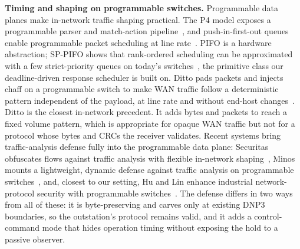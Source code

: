 \noindent\textbf{Timing and shaping on programmable switches.} Programmable data planes make in-network
traffic shaping practical. The P4 model exposes a programmable parser and match-action
pipeline~\cite{p4ccr2014}, and push-in-first-out queues enable programmable packet scheduling at line
rate~\cite{pifo2016}. PIFO is a hardware abstraction; SP-PIFO shows that rank-ordered scheduling can be
approximated with a few strict-priority queues on today's switches~\cite{sppifo2020}, the primitive
class our deadline-driven response scheduler is built on. Ditto pads packets and injects chaff on a
programmable switch to make WAN traffic
follow a deterministic pattern independent of the payload, at line rate and without end-host
changes~\cite{ditto2022}. Ditto is the closest in-network precedent. It adds bytes and packets to reach
a fixed volume pattern, which is appropriate for opaque WAN traffic but not for a protocol whose bytes
and CRCs the receiver validates. Recent systems bring traffic-analysis defense fully into the
programmable data plane: Securitas obfuscates flows against traffic analysis with flexible in-network
shaping~\cite{securitas2026}, Minos mounts a lightweight, dynamic defense against traffic analysis on
programmable switches~\cite{minos2025}, and, closest to our setting, Hu and Lin enhance industrial
network-protocol security with programmable switches~\cite{hulin2023}. The defense differs in two
ways from all of these: it is byte-preserving and carves only at existing DNP3 boundaries, so the
outstation's protocol remains valid, and it adds a control-command mode that hides operation timing
without exposing the hold to a passive observer.
